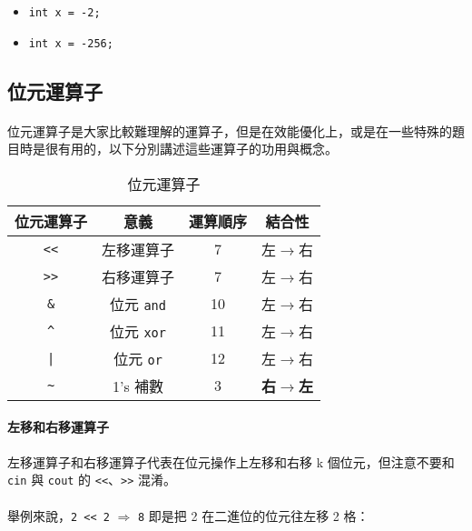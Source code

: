 \documentclass[12pt,a4paper,oneside]{report}
\begin{document}
\begin{CJK}{UTF8}{bkai}
\begin{itemize}
\item \lstinline!int x = -2;!
\item \lstinline!int x = -256;!
\end{itemize}
  
\subsection{位元運算子}

\paragraph{}位元運算子是大家比較難理解的運算子，但是在效能優化上，或是在一些特殊的題目時是很有用的，以下分別講述這些運算子的功用與概念。
\begin{table}[h!]
\centering
\begin{tabular}{|c|c|c|c|}
\hline
位元運算子 & 意義 & 運算順序 & 結合性\\
\hline
\hline
\lstinline!<<! & 左移運算子 & 7 & 左$\rightarrow$右\\
\hline
\lstinline!>>! & 右移運算子 & 7 & 左$\rightarrow$右\\
\hline
\lstinline!&!  & 位元 \texttt{and} & 10 & 左$\rightarrow$右\\
\hline
\lstinline!^!  & 位元 \texttt{xor} & 11 & 左$\rightarrow$右\\
\hline
\lstinline!|!  & 位元 \texttt{or} & 12 & 左$\rightarrow$右\\
\hline
\lstinline!~!  & 1's 補數  & 3 & \textbf{右$\rightarrow$左}\\
\hline
\end{tabular}
\caption{位元運算子}
\label{basic:cpp:table:operator:bitwise}
\end{table}

\paragraph{左移和右移運算子}左移運算子和右移運算子代表在位元操作上左移和右移 k 個位元，但注意不要和 \lstinline!cin! 與 \lstinline!cout! 的 \lstinline!<<!、\lstinline!>>! 混淆。

\paragraph{}舉例來說，\lstinline!2 << 2!{ $\Rightarrow$ \lstinline!8!} 即是把 2 在二進位的位元往左移 2 格：


\end{CJK}
\end{document}
